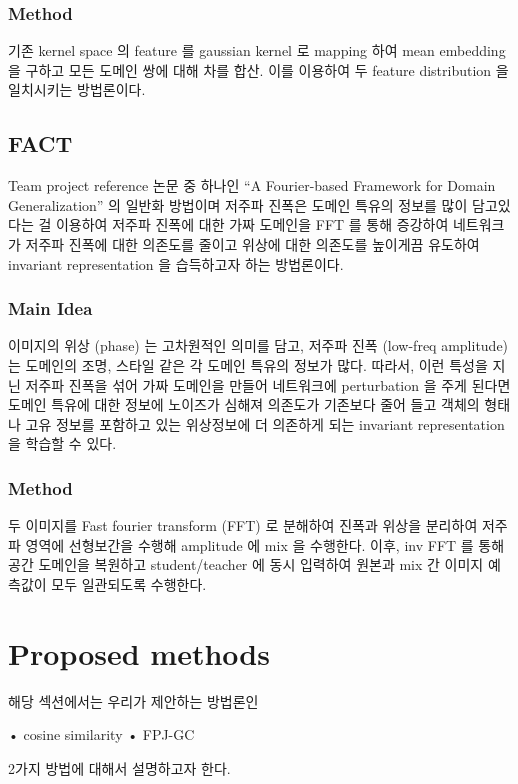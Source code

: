\subsubsection{Method}
기존 kernel space 의 feature 를 gaussian kernel 로 mapping 하여 mean embedding 을 구하고 모든 도메인 쌍에 대해 차를 합산. 이를 이용하여 두 feature distribution 을 일치시키는 방법론이다.

\subsection{FACT}

Team project reference 논문 중 하나인 “A Fourier-based Framework for Domain Generalization” 의 일반화 방법이며 저주파 진폭은 도메인 특유의 정보를 많이 담고있다는 걸 이용하여 저주파 진폭에 대한 가짜 도메인을 FFT 를 통해 증강하여 네트워크가 저주파 진폭에 대한 의존도를 줄이고 위상에 대한 의존도를 높이게끔 유도하여 invariant representation 을 습득하고자 하는 방법론이다.

\subsubsection{Main Idea}
이미지의 위상 (phase) 는 고차원적인 의미를 담고, 저주파 진폭 (low-freq amplitude) 는 도메인의 조명, 스타일 같은 각 도메인 특유의 정보가 많다. 따라서, 이런 특성을 지닌 저주파 진폭을 섞어 가짜 도메인을 만들어 네트워크에 perturbation 을 주게 된다면 도메인 특유에 대한 정보에 노이즈가 심해져 의존도가 기존보다 줄어 들고 객체의 형태나 고유 정보를 포함하고 있는 위상정보에 더 의존하게 되는 invariant representation 을 학습할 수 있다.

\subsubsection{Method}
두 이미지를 Fast fourier transform (FFT) 로 분해하여 진폭과 위상을 분리하여 저주파 영역에 선형보간을 수행해 amplitude 에 mix 을 수행한다. 이후, inv FFT 를 통해 공간 도메인을 복원하고 student/teacher 에 동시 입력하여 원본과 mix 간 이미지 예측값이 모두 일관되도록 수행한다.


\section{Proposed methods}
해당 섹션에서는 우리가 제안하는 방법론인

• cosine similarity
• FPJ-GC


2가지 방법에 대해서 설명하고자 한다.

